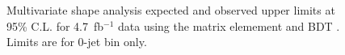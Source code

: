 \documentclass{cmspaper}
\begin{document}
\begin{figure}[!hbtp]
\centering
{}
\caption{ 
Multivariate shape analysis expected and observed upper limits at 95\% C.L. for 4.7~fb$^{-1}$ data using the 
matrix elemement  and BDT . Limits are for 0-jet bin only. } 
\label{fig:me_expected_5fb}
\end{figure}
\end{document}
